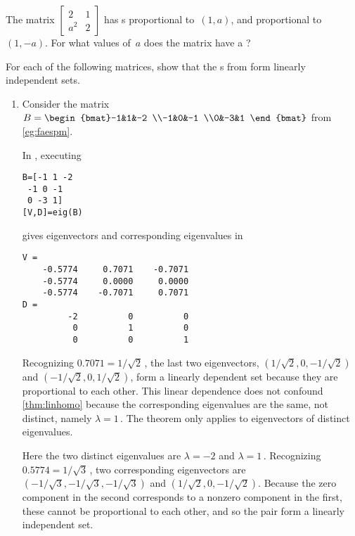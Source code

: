 \begin{activity}
The matrix \(\begin{bmatrix} 2&1\\a^2&2 \end{bmatrix}\) has s proportional to~\((1,a)\), and proportional to~\((1,-a)\).
For what values of~\(a\) does the matrix have a ?
\end{activity}






\begin{example} \label{eg:indepev}
For each of the following matrices, show that the s from  form linearly independent sets.
\begin{enumerate}[ref=\ref{eg:indepev}(\alph*)]
\item  Consider the matrix \(B=\begin{bmat}-1&1&-2
\\-1&0&-1
\\0&-3&1 \end{bmat}\) from \cref{eg:faespm}.
\begin{solution} 
In \script, executing 
\begin{verbatim}
B=[-1 1 -2
 -1 0 -1
 0 -3 1]
[V,D]=eig(B)
\end{verbatim}
\setbox\ajrqrbox\hbox{}%
\marginajrbox%
gives eigenvectors and corresponding eigenvalues in
\begin{verbatim}
V =
    -0.5774     0.7071    -0.7071
    -0.5774     0.0000     0.0000
    -0.5774    -0.7071     0.7071
D =
         -2          0          0
          0          1          0
          0          0          1
\end{verbatim} 
Recognizing \(0.7071=1/\sqrt2\)\,, the last two eigenvectors, \((1/\sqrt2,0,-1/\sqrt2)\) and  \((-1/\sqrt2,0,1/\sqrt2)\), form a linearly dependent set because they are proportional to each other.
This linear dependence does not confound  \cref{thm:linhomo} because the corresponding eigenvalues are the same, not distinct, namely \(\lambda=1\)\,.
The theorem only applies to eigenvectors of distinct eigenvalues.

Here the two distinct eigenvalues are \(\lambda=-2\) and \(\lambda=1\)\,.
Recognizing \(0.5774=1/\sqrt3\)\,, two corresponding eigenvectors are \((-1/\sqrt3,-1/\sqrt3,-1/\sqrt3)\) and \((1/\sqrt2,0,-1/\sqrt2)\).
Because the zero component in the second corresponds to a nonzero component in the first, these cannot be proportional to each other, and so the pair form a linearly independent set.
\end{solution}



\end{enumerate}
\end{example}
